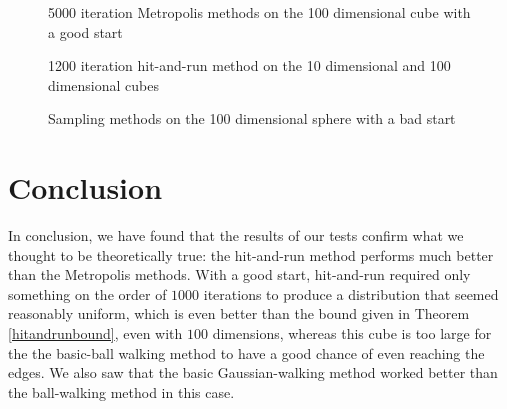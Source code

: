 \documentclass[11pt]{article}
\begin{document}
\begin{figure}
\centering
{}
\caption{5000 iteration Metropolis methods on the 100 dimensional cube with a good start}
\label{big_cube}
\end{figure}

\begin{figure}
\centering
{}
\caption{1200 iteration hit-and-run method on the 10 dimensional and 100 dimensional cubes}
\label{hitandrun}
\end{figure}

\begin{figure}
\centering
{}


\caption{Sampling methods on the 100 dimensional sphere with a bad start}
\label{sphere}
\end{figure}

\section{Conclusion}\label{conclusion}

In conclusion, we have found that the results of our tests confirm what we thought to be theoretically true: the hit-and-run method performs much better than the Metropolis methods. With a good start, hit-and-run required only something on the order of $1000$ iterations to produce a distribution that seemed reasonably uniform, which is even better than the bound given in Theorem \ref{hitandrunbound}, even with $100$ dimensions, whereas this cube is too large for the the basic-ball walking method to have a good chance of even reaching the edges. We also saw that the basic Gaussian-walking method worked better than the ball-walking method in this case.
\end{document}
